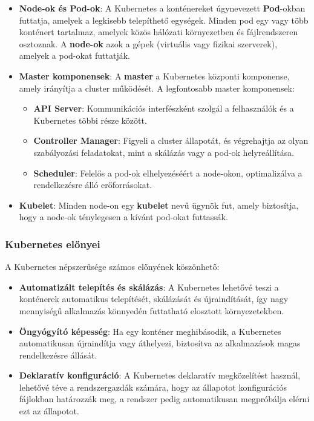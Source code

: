 \begin{itemize}
	\item \textbf{Node-ok és Pod-ok}: A Kubernetes a konténereket úgynevezett \textbf{Pod}-okban futtatja, amelyek a legkisebb telepíthető egységek. Minden pod egy vagy több konténert tartalmaz, amelyek közös hálózati környezetben és fájlrendszeren osztoznak. A \textbf{node-ok} azok a gépek (virtuális vagy fizikai szerverek), amelyek a pod-okat futtatják.
	
	\item \textbf{Master komponensek}: A \textbf{master} a Kubernetes központi komponense, amely irányítja a cluster működését. A legfontosabb master komponensek:
	\begin{itemize}
		\item \textbf{API Server}: Kommunikációs interfészként szolgál a felhasználók és a Kubernetes többi része között.
		\item \textbf{Controller Manager}: Figyeli a cluster állapotát, és végrehajtja az olyan szabályozási feladatokat, mint a skálázás vagy a pod-ok helyreállítása.
		\item \textbf{Scheduler}: Felelős a pod-ok elhelyezéséért a node-okon, optimalizálva a rendelkezésre álló erőforrásokat.
	\end{itemize}
	
	\item \textbf{Kubelet}: Minden node-on egy \textbf{kubelet} nevű ügynök fut, amely biztosítja, hogy a node-ok ténylegesen a kívánt pod-okat futtassák.
\end{itemize}

\subsubsection{Kubernetes előnyei}

A Kubernetes népszerűsége számos előnyének köszönhető:

\begin{itemize}
	\item \textbf{Automatizált telepítés és skálázás}: A Kubernetes lehetővé teszi a konténerek automatikus telepítését, skálázását és újraindítását, így nagy mennyiségű alkalmazás könnyedén futtatható elosztott környezetekben.
	\item \textbf{Öngyógyító képesség}: Ha egy konténer meghibásodik, a Kubernetes automatikusan újraindítja vagy áthelyezi, biztosítva az alkalmazások magas rendelkezésre állását.
	\item \textbf{Deklaratív konfiguráció}: A Kubernetes deklaratív megközelítést használ, lehetővé téve a rendszergazdák számára, hogy az állapotot konfigurációs fájlokban határozzák meg, a rendszer pedig automatikusan megpróbálja elérni ezt az állapotot.
\end{itemize}

